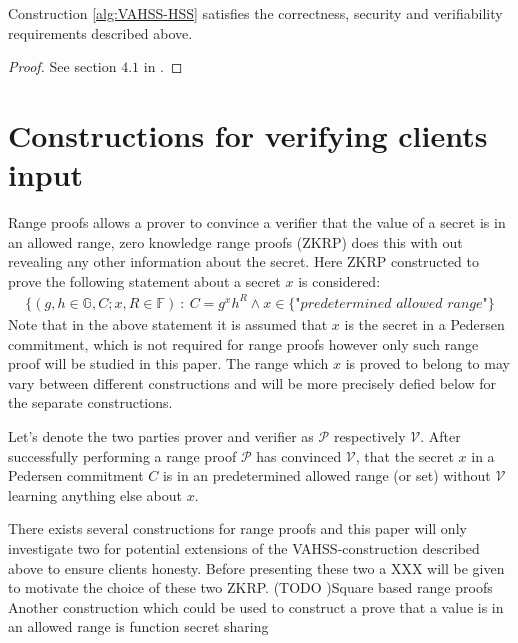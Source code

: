 \begin{thm}
\label{thm:VAHSS_CSV}
Construction \ref{alg:VAHSS-HSS} satisfies the correctness, security and verifiability requirements described above.
\end{thm}
\begin{proof}
See section $4.1$ in \cite{VAHSS}.
\end{proof}





\section{Constructions for verifying clients input}
\label{sec:RF_theory}
Range proofs allows a prover to convince a verifier that the value of a secret is in an allowed range, zero knowledge range proofs (ZKRP) does this with out revealing any other information about the secret. Here ZKRP constructed to prove the following statement about a secret $x$ is considered:
\begin{align} \label{eq:RP_statement}
    \{(g,h\in\mathds{G},C;x,R\in\mathds{F})\::\:C= g^x h^R \wedge x \in \{\textit{"predetermined allowed range"}\}
\end{align}
Note that in the above statement  it is assumed that $x$ is the secret in a Pedersen commitment, which is not required for range proofs however only such range proof will be studied in this paper. The range which $x$ is proved to belong to may vary between different constructions and will be more precisely defied below for the separate constructions. 

Let's denote the two parties prover and verifier as  $\mathcal{P}$ respectively $\mathcal{V}$. After successfully performing a range proof  $\mathcal{P}$ has convinced $\mathcal{V}$, that the secret $x$ in a Pedersen commitment $C$ is in an predetermined allowed range (or set) without $\mathcal{V}$ learning anything else about $x$.

There exists several constructions for range proofs and this paper will only investigate two for potential extensions of the VAHSS-construction described above to ensure clients honesty. Before presenting these two a XXX will be given to motivate the choice of these two ZKRP. (TODO )Square based range proofs \cite{Efficient_proof_interval} %
Another construction which could be used to construct a prove that a value is in an allowed range is function secret sharing \cite{FSS} %


